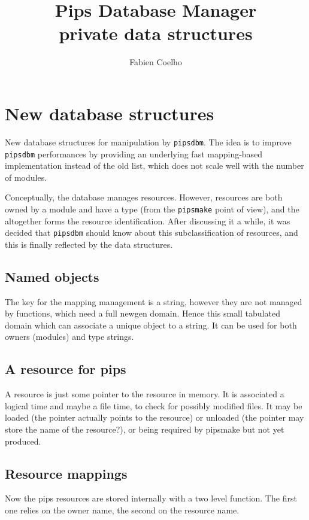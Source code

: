 \documentclass[a4paper]{article}
\title{Pips Database Manager \\ private data structures}
\author{Fabien Coelho}
\begin{document}
\maketitle

\section{New database structures}
\label{sec:new}

New database structures for manipulation by \texttt{pipsdbm}.
The idea is to improve \texttt{pipsdbm} performances by providing an
underlying fast mapping-based implementation instead of the old list,
which does not scale well with the number of modules.

Conceptually, the database manages resources. However, resources are both
owned by a module and have a type (from the \texttt{pipsmake} point of view),
and the altogether forms the resource identification. After discussing it
a while, it was decided that \texttt{pipsdbm} should know about this
subclassification of resources, and this is finally reflected by the
data structures.


\subsection{Named objects}
\label{sec:named}

The key for the mapping management is a string, however they are not
managed by functions, which need a full newgen domain. Hence this small
tabulated domain which can associate a unique object to a string.
It can be used for both owners (modules) and type strings.



\subsection{A resource for pips}
\label{sec:rs}

A resource is just some pointer to the resource in memory.
It is associated a logical time and maybe a file time, to check for
possibly modified files. It may be loaded (the pointer actually points to
the resource) or unloaded (the pointer may store the name of the
resource?), or being required by pipsmake but not yet produced.




\subsection{Resource mappings}
\label{sec:map}

Now the pips resources are stored internally with a two level function. 
The first one relies on the owner name, the second on the resource name.


\end{document}
